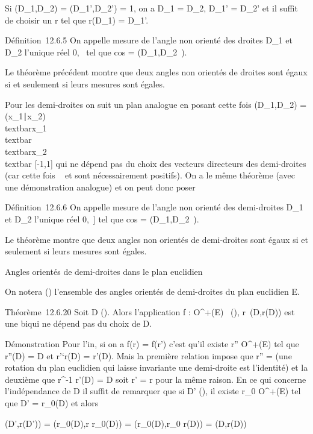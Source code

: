 \documentclass[]{article}
\begin{document}
Si \phi(D\_1,D\_2) = \phi(D\_1',D\_2') = 1, on
a D\_1 = D\_2, D\_1' = D\_2' et il
suffit de choisir un r tel que r(D\_1) = D\_1'.

Définition~12.6.5 On appelle mesure de l'angle non orienté des droites
D\_1 et D\_2 l'unique réel \theta \in {[}0,\pi~\diagup2{]} tel que
cos \theta = \phi(D\_1,D\_2~).

Le théorème précédent montre que deux angles non orientés de droites
sont égaux si et seulement si leurs mesures sont égales.

Pour les demi-droites on suit un plan analogue en posant cette fois
\phi(D\_1,D\_2) =
(x\_1∣x\_2)
\over
\\textbar{}x\_1\\textbar{}
\\textbar{}x\_2\\textbar{} \in
{[}-1,1{]} qui ne dépend pas du choix des vecteurs directeurs des
demi-droites (car cette fois \lambda~ et \mu sont nécessairement positifs). On a
le même théorème (avec une démonstration analogue) et on peut donc poser

Définition~12.6.6 On appelle mesure de l'angle non orienté des
demi-droites D\_1 et D\_2 l'unique réel \theta \in {[}0,\pi~{]}
tel que cos \theta = \phi(D\_1,D\_2~).

Le théorème montre que deux angles non orientés de demi-droites sont
égaux si et seulement si leurs mesures sont égales.

Angles orientés de demi-droites dans le plan euclidien

On notera \tildeA() l'ensemble des angles orientés
de demi-droites du plan euclidien E.

Théorème~12.6.20 Soit D \in\tildeD(). Alors
l'application f : O^+(E) \rightarrow~\tildeA(),
r\mapsto~\widehat(D,r(D)) est une
bi\jmathection qui ne dépend pas du choix de D.

Démonstration Pour l'in, si on a f(r) = f(r') c'est qu'il
existe r'' \in O^+(E) tel que r''(D) = D et r'`\cdot r(D) = r'(D).
Mais la première relation impose que r'' = \mathrmId
(une rotation du plan euclidien qui laisse invariante une demi-droite
est l'identité) et la deuxième que r^-1 \cdot r'(D) = D soit r' =
r pour la même raison. En ce qui concerne l'indépendance de D il suffit
de remarquer que si D' \in\tildeD(), il existe
r\_0 \in O^+(E) tel que D' = r\_0(D) et alors

\widehat(D',r(D')) =\widehat
(r\_0(D),r \cdot r\_0(D)) =\widehat
(r\_0(D),r\_0 \cdot r(D)) =\widehat
(D,r(D))
\end{document}
